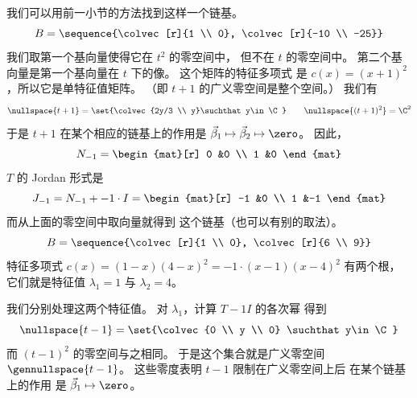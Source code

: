 \begin{exercises}
\begin{answer}
\begin{exparts}
           我们可以用前一小节的方法找到这样一个链基。
           \begin{equation*}
                 B=\sequence{\colvec[r]{1 \\ 0},
                             \colvec[r]{-10 \\ -25}}
           \end{equation*}
           我们取第一个基向量使得它在 $t^2$ 的零空间中，
           但不在 $t$ 的零空间中。
           第二个基向量是第一个基向量在 $t$ 下的像。
        \partsitem 这个矩阵的特征多项式
           是 \( c(x)=(x+1)^2 \)，所以它是单特征值矩阵。
           （即 $t+1$ 的广义零空间是整个空间。） 
           我们有
           \begin{equation*}
             \nullspace{t+1}=\set{\colvec{2y/3 \\ y}\suchthat
                                     y\in\C} 
             \qquad
             \nullspace{(t+1)^2}=\C^2 
           \end{equation*}
           于是 $t+1$ 在某个相应的链基上的作用是
           $\vec{\beta}_1\mapsto\vec{\beta}_2\mapsto\zero$。
           因此， 
           \begin{equation*}
             N_{-1}
             =
             \begin{mat}[r]
                0  &0  \\
                1  &0 
             \end{mat}
           \end{equation*}
           $T$ 的 Jordan 形式是
           \begin{equation*}
             J_{-1}=N_{-1}+-1\cdot I
             =
             \begin{mat}[r]
               -1  &0  \\
                1  &-1
             \end{mat}
           \end{equation*}
           而从上面的零空间中取向量就得到
           这个链基（也可以有别的取法）。
           \begin{equation*}
             B=\sequence{\colvec[r]{1 \\ 0},
                         \colvec[r]{6 \\ 9}}
           \end{equation*}
        \partsitem 特征多项式
            \( c(x)=(1-x)(4-x)^2=-1\cdot (x-1)(x-4)^2 \) 有两个根，
            它们就是特征值 $\lambda_1=1$ 与 $\lambda_2=4$。

            我们分别处理这两个特征值。
            对 $\lambda_1$，计算 $T-1I$ 的各次幂
            得到
            \begin{equation*}
              \nullspace{t-1}=\set{\colvec{0 \\ y \\ 0}
                                      \suchthat y\in\C}
            \end{equation*}
            而 $(t-1)^2$ 的零空间与之相同。
            于是这个集合就是广义零空间 
            $\gennullspace{t-1}$。
            这些零度表明 $t-1$ 限制在广义零空间上后
            在某个链基上的作用
            是 $\vec{\beta}_1\mapsto\zero$。


\end{exparts}
\end{answer}
\end{exercises}
